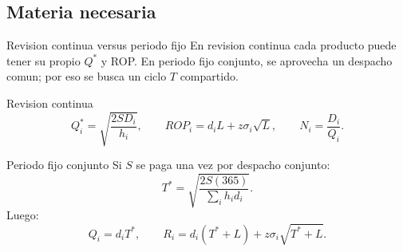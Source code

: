 \subsection{Materia necesaria}

\begin{definicion}{Revision continua versus periodo fijo}
En revision continua cada producto puede tener su propio \(Q^*\) y ROP. En periodo fijo conjunto, se aprovecha un despacho comun; por eso se busca un ciclo \(T\) compartido.
\end{definicion}

\begin{formulas}{Revision continua}
\[
Q_i^*=\sqrt{\frac{2SD_i}{h_i}},
\qquad
ROP_i=d_iL+z\sigma_i\sqrt L,
\qquad
N_i=\frac{D_i}{Q_i}.
\]
\end{formulas}

\begin{formulas}{Periodo fijo conjunto}
Si \(S\) se paga una vez por despacho conjunto:
\[
T^*=\sqrt{\frac{2S(365)}{\sum_i h_i d_i}}.
\]
Luego:
\[
Q_i=d_iT^*,
\qquad
R_i=d_i(T^*+L)+z\sigma_i\sqrt{T^*+L}.
\]
\end{formulas}
